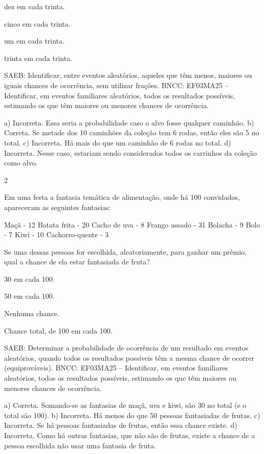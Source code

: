 {\begin{escolha}
\begin{escolha}
\item
  dez em cada trinta.
\item
  cinco em cada trinta.
\item
  um em cada trinta.
\item
  trinta em cada trinta.
\end{escolha}

SAEB: Identificar, entre eventos aleatórios, aqueles que têm menos, maiores ou iguais chances de ocorrência, sem utilizar frações. 
BNCC: EF03MA25 -- Identificar, em eventos familiares aleatórios, todos os resultados possíveis,
estimando os que têm maiores ou menores chances de ocorrência.


a) Incorreta. Essa seria a probabilidade caso o alvo fosse qualquer caminhão.
b) Correta. Se metade dos 10 caminhões da coleção tem 6 rodas, então eles são 5 no total.
c) Incorreta. Há mais do que um caminhão de 6 rodas no total.
d) Incorreta. Nesse caso, estariam sendo considerados todos os carrinhos da coleção como alvo.

\num{2}

Em uma festa a fantasia temática de alimentação, onde há 100 convidados, apareceram as seguintes fantasias:

Maçã - 12
Batata frita - 20
Cacho de uva - 8
Frango assado - 31
Bolacha - 9
Bolo - 7
Kiwi - 10
Cachorro-quente - 3

  Se uma dessas pessoas for escolhida, aleatoriamente, para ganhar um prêmio, qual a chance de ela estar fantasiada de fruta?


\begin{escolha}
\item
30 em cada 100.
\item
50 em cada 100.
\item
Nenhuma chance.
\item
Chance total, de 100 em cada 100.
\end{escolha}

SAEB: Determinar a probabilidade de ocorrência de um resultado em eventos aleatórios, quando todos os resultados possíveis têm a mesma chance de ocorrer (equiprováveis).  
BNCC: EF03MA25 -- Identificar, em eventos familiares aleatórios, todos os resultados possíveis,
estimando os que têm maiores ou menores chances de ocorrência.

a) Correta. Somando-se as fantasias de maçã, uva e kiwi, são 30 no total (e o total são 100).
b) Incorreta. Há menos do que 50 pessoas fantasiadas de frutas.
c) Incorreta. Se há pessoas fantasiadas de frutas, então essa chance existe.
d) Incorreta. Como há outras fantasias, que não são de frutas, existe a chance de a pessoa escolhida não usar uma fantasia de fruta.


\end{escolha}}
